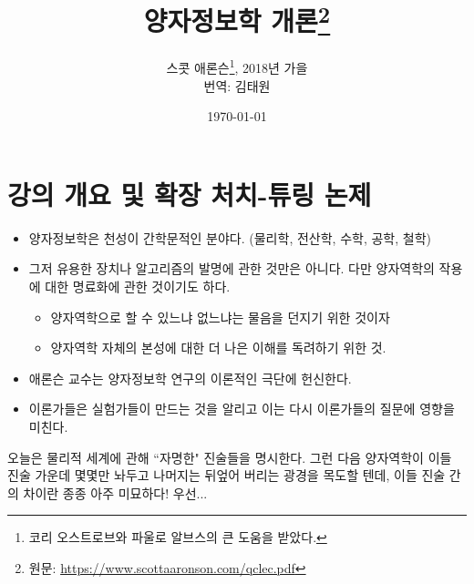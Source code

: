 \documentclass[a4paper,chapter,kosection,atbegshi,hidelinks]{oblivoir}
\begin{document}
\title{양자정보학 개론\thanks{원문: \url{https://www.scottaaronson.com/qclec.pdf}}}
\author{
    스콧 애론슨\thanks{코리 오스트로브와 파울로 알브스의 큰 도움을 받았다.}, 
    2018년 가을\\
    번역: 김태원
}
\date{\today}
\newpage
\maketitle\thispagestyle{empty}\newpage

\tableofcontents

\chapter{강의 개요 및 확장 처치-튜링 논제}
\begin{itemize}[label=\(\blacktriangleright\)]
    \item 양자정보학은 천성이 간학문적인 분야다. (물리학, 전산학, 수학, 공학, 철학)
    \item 그저 유용한 장치나 알고리즘의 발명에 관한 것만은 아니다.
        다만 양자역학의 작용에 대한 명료화에 관한 것이기도 하다.
    \begin{itemize}
        \item 양자역학으로 할 수 있느냐 없느냐는 물음을 던지기 위한 것이자
        \item 양자역학 자체의 본성에 대한 더 나은 이해를 독려하기 위한 것.
    \end{itemize}
    \item 애론슨 교수는 양자정보학 연구의 이론적인 극단에 헌신한다.
    \item 이론가들은 실험가들이 만드는 것을 알리고 이는 다시 이론가들의 질문에 영향을 미친다.
\end{itemize}\hfill\break
오늘은 물리적 세계에 관해 ``자명한" 진술들을 명시한다.
그런 다음 양자역학이 이들 진술 가운데 몇몇만 놔두고 나머지는 뒤엎어 버리는 광경을
목도할 텐데, 이들 진술 간의 차이란 종종 아주 미묘하다!
우선...
\end{document}
